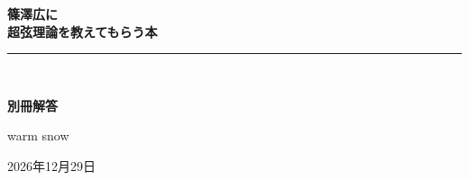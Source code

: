 \documentclass[paper=b5j,fontsize=11Q,jafontsize=11Q,baselineskip=19Q]{jlreq}
\newcommand{\runningtitle}{章題未定}
\numberwithin{equation}{section}
\begin{document}
\renewcommand{\runningtitle}{別冊解答}
\hypersetup{pageanchor=false}
\begin{titlepage}
  \thispagestyle{empty}
  \vspace*{26mm}
  \begin{center}
    {\sffamily\bfseries\fontsize{18pt}{24pt}\selectfont
      篠澤広に\\[2mm]超弦理論を教えてもらう本\par}
    \vspace{8mm}
    \rule{.72\linewidth}{1pt}\\[5mm]
    {\sffamily\bfseries\fontsize{12pt}{17pt}\selectfont
      別冊解答\par}
    \vfill
    {\sffamily warm snow\par}
    \vspace{3mm}
    {\sffamily\small 2026年12月29日\par}
  \end{center}
\end{titlepage}

\hypersetup{pageanchor=true}
\setcounter{tocdepth}{2}
\tableofcontents
\clearpage
{}
\end{document}
